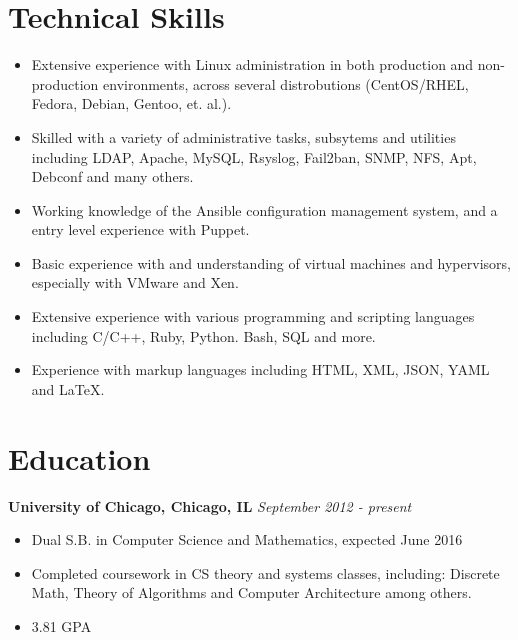 \documentclass[10pt,letterpaper]{article} %
\begin{document}
    \section*{Technical Skills} 
        \begin{itemize}
        \item Extensive experience with Linux administration in both production and non-production environments,  across several distrobutions (CentOS/RHEL, Fedora, Debian, Gentoo, et. al.).  
	\item Skilled with a variety of administrative tasks, subsytems and utilities including LDAP, Apache, MySQL, Rsyslog, Fail2ban, SNMP, NFS, Apt, Debconf and many others. 
        \item Working knowledge of the Ansible configuration management system, and a entry level experience with Puppet.
        \item Basic experience with and understanding of virtual machines and hypervisors, especially with  VMware and Xen. 
        \item Extensive experience with various programming and scripting languages including C/C++, Ruby, Python. Bash, SQL and more.
        \item Experience with markup languages including HTML, XML, JSON, YAML and \LaTeX.
        \end{itemize}          
    \section*{Education}
        \textbf{University of Chicago, Chicago, IL } \hfill \textit{ September 2012 - present } 
        \begin{itemize} 
            \item Dual S.B. in Computer Science and Mathematics, expected June 2016 
            \item Completed coursework in CS theory and systems classes, including: Discrete Math, Theory of Algorithms and Computer Architecture among others. 
            \item 3.81 GPA
        \end{itemize}
    \vfill
    \centerline{ }
\end{document}
